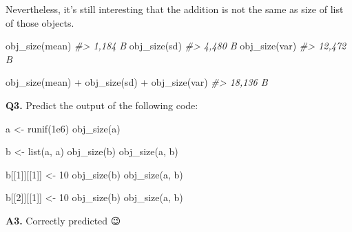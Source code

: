 \documentclass[
]{book}
\newenvironment{Shaded}{\begin{snugshade}}{\end{snugshade}}
\newcommand{\CommentTok}[1]{\textcolor[rgb]{0.56,0.35,0.01}{\textit{#1}}}
\newcommand{\DecValTok}[1]{\textcolor[rgb]{0.00,0.00,0.81}{#1}}
\newcommand{\FloatTok}[1]{\textcolor[rgb]{0.00,0.00,0.81}{#1}}
\newcommand{\FunctionTok}[1]{\textcolor[rgb]{0.00,0.00,0.00}{#1}}
\newcommand{\NormalTok}[1]{#1}
\newcommand{\OtherTok}[1]{\textcolor[rgb]{0.56,0.35,0.01}{#1}}
\newcommand{\SpecialCharTok}[1]{\textcolor[rgb]{0.00,0.00,0.00}{#1}}
\begin{document}
Nevertheless, it's still interesting that the addition is not the same as size of list of those objects.

\begin{Shaded}
\begin{Highlighting}[]
\FunctionTok{obj\_size}\NormalTok{(mean)}
\CommentTok{\#\textgreater{} 1,184 B}
\FunctionTok{obj\_size}\NormalTok{(sd)}
\CommentTok{\#\textgreater{} 4,480 B}
\FunctionTok{obj\_size}\NormalTok{(var)}
\CommentTok{\#\textgreater{} 12,472 B}

\FunctionTok{obj\_size}\NormalTok{(mean) }\SpecialCharTok{+} \FunctionTok{obj\_size}\NormalTok{(sd) }\SpecialCharTok{+} \FunctionTok{obj\_size}\NormalTok{(var)}
\CommentTok{\#\textgreater{} 18,136 B}
\end{Highlighting}
\end{Shaded}

\textbf{Q3.} Predict the output of the following code:

\begin{Shaded}
\begin{Highlighting}[]
\NormalTok{a }\OtherTok{\textless{}{-}} \FunctionTok{runif}\NormalTok{(}\FloatTok{1e6}\NormalTok{)}
\FunctionTok{obj\_size}\NormalTok{(a)}

\NormalTok{b }\OtherTok{\textless{}{-}} \FunctionTok{list}\NormalTok{(a, a)}
\FunctionTok{obj\_size}\NormalTok{(b)}
\FunctionTok{obj\_size}\NormalTok{(a, b)}

\NormalTok{b[[}\DecValTok{1}\NormalTok{]][[}\DecValTok{1}\NormalTok{]] }\OtherTok{\textless{}{-}} \DecValTok{10}
\FunctionTok{obj\_size}\NormalTok{(b)}
\FunctionTok{obj\_size}\NormalTok{(a, b)}

\NormalTok{b[[}\DecValTok{2}\NormalTok{]][[}\DecValTok{1}\NormalTok{]] }\OtherTok{\textless{}{-}} \DecValTok{10}
\FunctionTok{obj\_size}\NormalTok{(b)}
\FunctionTok{obj\_size}\NormalTok{(a, b)}
\end{Highlighting}
\end{Shaded}

\textbf{A3.} Correctly predicted 😉
\end{document}
